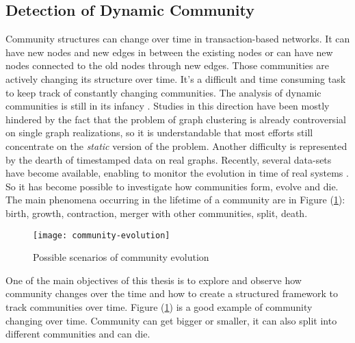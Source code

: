 \subsection{Detection of Dynamic Community}\label{subsub:dynamic_community}
Community structures can change over time in transaction-based networks. It can have new nodes and new edges in between the existing nodes or can have new nodes connected to the old nodes through new edges. Those communities are actively changing its structure over time. It's a difficult and time consuming task to keep track of constantly changing communities. The analysis of dynamic communities is still in its infancy \cite{ref-6}. Studies in this direction have been mostly hindered by the fact that the problem of graph clustering is already controversial on single graph realizations, so it is understandable that most efforts still concentrate on the \textit{static} version of the problem. Another difficulty is represented by the dearth of timestamped data on real graphs. Recently, several data-sets have become available, enabling to monitor the evolution in time of real systems \cite{ref-23}. So it has become possible to investigate how communities form, evolve and die. The main phenomena occurring in the lifetime of a community are in Figure (\ref{fig:community-evolution}): birth, growth, contraction, merger with other communities, split, death.

\vfill
\pagebreak

\begin{figure}[!ht]
	\centering
	\texttt{[image: community-evolution]}
	\caption{Possible scenarios of community evolution \cite{ref-23}}
	\label{fig:community-evolution}
\end{figure}

One of the main objectives of this thesis is to explore and observe how community changes over the time and how to create a structured framework to track communities over time. Figure (\ref{fig:community-evolution}) is a good example of community changing over time. Community can get bigger or smaller, it can also split into different communities and can die.